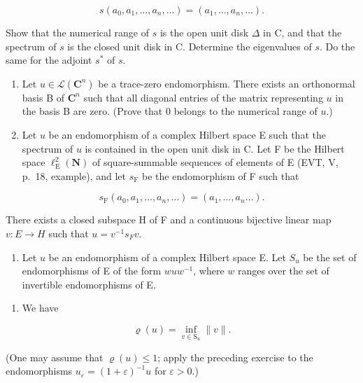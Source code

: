 \[
s (a _ {0}, a _ {1}, \dots , a _ {n}, \dots) = (a _ {1}, \dots , a _ {n}, \dots).
\]

Show that the numerical range of \(s\) is the open unit disk \(\Delta\) in C, and that the spectrum of \(s\) is the closed unit disk in C. Determine the eigenvalues of \(s\). Do the same for the adjoint \(s^{*}\) of \(s\).

\begin{enumerate}
\def\labelenumi{\arabic{enumi})}
\setcounter{enumi}{5}
\item
  Let \(u \in \mathcal{L}(\mathbf{C}^n)\) be a trace-zero endomorphism. There exists an orthonormal basis B of \(\mathbf{C}^n\) such that all diagonal entries of the matrix representing \(u\) in the basis B are zero. (Prove that 0 belongs to the numerical range of \(u\).)
\item
  Let \(u\) be an endomorphism of a complex Hilbert space E such that the spectrum of \(u\) is contained in the open unit disk in C. Let F be the Hilbert space \(\ell_{\mathrm{E}}^{2}(\mathbf{N})\) of square-summable sequences of elements of E (EVT, V, p.~18, example), and let \(s_{\mathrm{F}}\) be the endomorphism of F such that
\end{enumerate}

\[
s _ {\mathrm{F}} (a _ {0}, a _ {1}, \ldots , a _ {n}, \ldots) = (a _ {1}, \ldots , a _ {n} \ldots).
\]

There exists a closed subspace H of F and a continuous bijective linear map \(v: E \rightarrow H\) such that \(u = v^{-1}s_{F}v\).

\begin{enumerate}
\def\labelenumi{\arabic{enumi})}
\setcounter{enumi}{7}
\tightlist
\item
  Let \(u\) be an endomorphism of a complex Hilbert space E. Let \(S_u\) be the set of endomorphisms of E of the form \(wuw^{-1}\), where \(w\) ranges over the set of invertible endomorphisms of E.
\end{enumerate}

\begin{enumerate}
\def\labelenumi{\alph{enumi})}
\tightlist
\item
  We have
\end{enumerate}

\[
\varrho (u) = \inf _ {v \in \mathrm{S} _ {u}} \| v \|.
\]

(One may assume that \(\varrho(u) \leqslant 1\); apply the preceding exercise to the endomorphisms \(u_{\varepsilon} = (1 + \varepsilon)^{-1} u\) for \(\varepsilon > 0\).)

